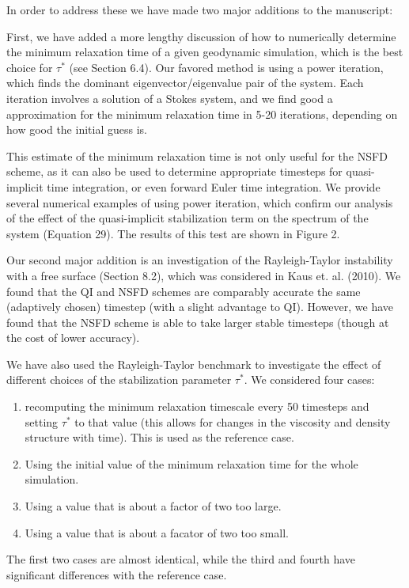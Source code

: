 \documentclass[a4paper,12pt]{article}
\begin{document}
In order to address these we have made two major additions to the manuscript:

First, we have added a more lengthy discussion of how to numerically determine the minimum relaxation time of
a given geodynamic simulation, which is the best choice for $\tau^*$ (see Section 6.4). Our favored method
is using a power iteration, which finds the dominant eigenvector/eigenvalue pair of the system.
Each iteration involves a solution of a Stokes system, and we find good a approximation for the minimum
relaxation time in 5-20 iterations, depending on how good the initial guess is.

This estimate of the minimum relaxation time is not only useful for the NSFD scheme,
as it can also be used to determine appropriate timesteps for quasi-implicit time integration,
or even forward Euler time integration. 
We provide several numerical examples of using power iteration, which confirm our analysis
of the effect of the quasi-implicit stabilization term on the spectrum of the system (Equation 29).
The results of this test are shown in Figure 2.

Our second major addition is an investigation of the Rayleigh-Taylor instability with a free surface (Section 8.2),
which was considered in Kaus et. al. (2010). We found that the QI and NSFD schemes are comparably
accurate the same (adaptively chosen) timestep (with a slight advantage to QI). However, we have found
that the NSFD scheme is able to take larger stable timesteps (though at the cost of lower accuracy).

We have also used the Rayleigh-Taylor benchmark to investigate the effect of different choices of 
the stabilization parameter $\tau^*$. We considered four cases: 
\begin{enumerate}
  \item recomputing the minimum relaxation timescale every 50 timesteps and setting $\tau^*$ to that value 
    (this allows for changes in the viscosity and density structure with time). This is used as the reference case.
  \item Using the initial value of the minimum relaxation time for the whole simulation.
  \item Using a value that is about a factor of two too large.
  \item Using a value that is about a facator of two too small.
\end{enumerate}
The first two cases are almost identical, while the third and fourth have significant differences with the reference case. 
\end{document}
